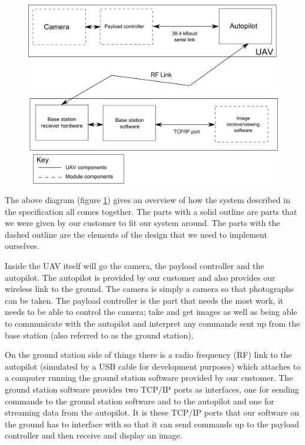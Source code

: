 \begin{figure}[H]
        \centering
        \includegraphics[width=1.00\textwidth]{figures/spec_block_diagram_2.png}
        \label{fig:block1}
\end{figure}

The above diagram (figure \ref{fig:block1}) gives an overview of how the system described in the specification all comes together. The parts with a solid outline are parts that we were given by our customer to fit our system around. The parts with the dashed outline are the elements of the design that we need to implement ourselves.

Inside the UAV itself will go the camera, the payload controller and the autopilot. The autopilot is provided by our customer and also provides our wireless link to the ground. The camera is simply a camera so that photographs can be taken. The payload controller is the part that needs the most work, it needs to be able to control the camera; take and get images as well as being able to communicate with the autopilot and interpret any commands sent up from the base station (also referred to as the ground station).

On the ground station side of things there is a radio frequency (RF) link to the autopilot (simulated by a USB cable for development purposes) which attaches to a computer running the ground station software provided by our customer. The ground station software provides two TCP/IP ports as interfaces, one for sending commands to the ground station software and to the autopilot and one for streaming data from the autopilot. It is these TCP/IP ports that our software on the ground has to interface with so that it can send commands up to the payload controller and then receive and display an image.

